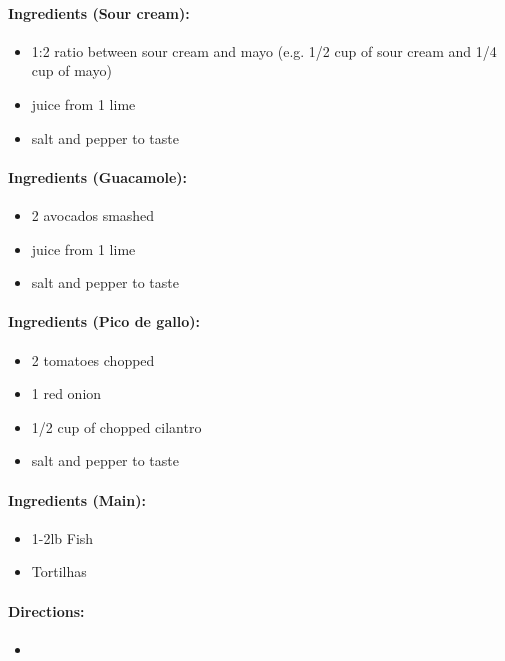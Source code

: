 \documentclass{article}
\begin{document}
\paragraph{Ingredients (Sour cream):}
\begin{itemize}
	\item 1:2 ratio between sour cream and mayo (e.g. 1/2 cup of sour cream and 1/4 cup of mayo)
	\item juice from 1 lime
	\item salt and pepper to taste
\end{itemize}

\paragraph{Ingredients (Guacamole):}
\begin{itemize}
	\item 2 avocados smashed
	\item juice from 1 lime
	\item salt and pepper to taste
\end{itemize}

\paragraph{Ingredients (Pico de gallo):}
\begin{itemize}
	\item 2 tomatoes chopped
	\item 1 red onion
	\item 1/2 cup of chopped cilantro
	\item salt and pepper to taste
\end{itemize}

\paragraph{Ingredients (Main):}
\begin{itemize}
	\item 1-2lb Fish
	\item Tortilhas
\end{itemize}

\paragraph{Directions:}
\begin{itemize}
	\item
\end{itemize}
\end{document}
